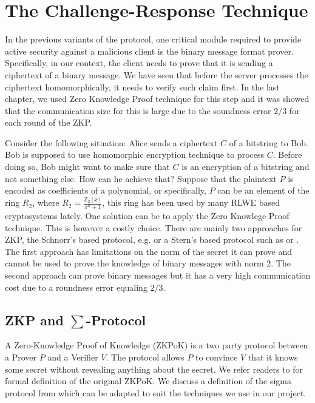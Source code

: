 \section{The Challenge-Response Technique}
\label{sec:6challenge}
In the previous variants of the protocol, one critical module required to
provide active security against a malicious client is the binary message format
prover. Specifically, in our context, the client needs to prove that it is
sending a ciphertext of a binary message. We have seen that before the server
processes the ciphertext homomorphically, it needs to verify such claim
first. In the last chapter, we used Zero Knowledge Proof technique for this
step and it was showed that the communication size for this is large due to the soundness error $2/3$ for each round of the ZKP.


Consider the following situation: Alice sends a ciphertext \(C\) of a
bitstring to Bob. Bob is supposed to use homomorphic encryption technique to
process \(C\). Before doing so, Bob might want to make sure that \(C\) is an
encryption of a bitstring and not something else. How can he achieve that?
Suppose that the plaintext \(P\) is encoded as coefficients of a polynomial, or
specifically, \(P\) can be an element of the ring \(R_{2}\), where
\(R_{2} = \frac{\mathbb{Z}_{2}[x]}{x^{n} + 1}\), this ring has been used by many
RLWE based cryptosystems lately. One solution can be to apply the Zero Knowlege
Proof technique. This is however a costly choice. There are mainly two
approaches for ZKP, the Schnorr's based protocol,
e.g. \cite{benhamouda2014better} or a Stern's based protocol such as
\cite{stern1993new} or \cite{ling2013improved}. The first approach has
limitations on the norm of the secret it can prove and cannot be used to prove
the knowledge of binary messages with norm 2. The second approach can prove
binary messages but it has a very high communication cost due to a roundness
error equaling \(2/3\).
\subsection{ZKP and $\sum$-Protocol}
\label{sub:zkp_and_sum_protocol}
A Zero-Knowledge Proof of Knowledge (ZKPoK) is a two party protocol between a
Prover $P$ and a Verifier $V$. The protocol allows $P$ to convince $V$ that it
knows some secret without revealing anything about the secret. We refer readers
to \cite{bellare1992defining} for formal definition of the original ZKPoK. We
discuss a definition of the sigma protocol from \cite{benhamouda2014better} which can be adapted to suit the techniques we use in our project.


